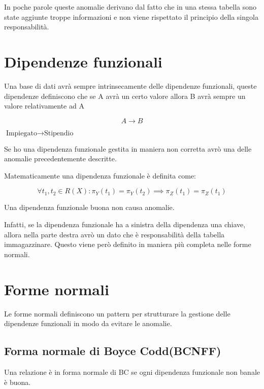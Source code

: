 In poche parole queste anomalie derivano dal fatto che in una stessa tabella sono state aggiunte troppe informazioni e non viene rispettato il principio della singola responsabilità.

\section{Dipendenze funzionali}

Una base di dati avrà sempre intrinsecamente delle dipendenze funzionali, queste dipendenze definiscono che se A avrà un certo valore allora B avrà sempre un valore relativamente ad A

\[ A \rightarrow B\]

\begin{exmp}
    $\text{Impiegato} \rightarrow \text{Stipendio}$
\end{exmp} 

Se ho una dipendenza funzionale gestita in maniera non corretta avrò una delle anomalie precedentemente descritte.

Matematicamente una dipendenza funzionale è definita come:

\[\forall t_1,t_2 \in R(X) : \pi_Y(t_1) = \pi_Y(t_2) \implies \pi_Z(t_1) = \pi_Z(t_1) \]


Una dipendenza funzionale buona non causa anomalie.

Infatti, se la dipendenza funzionale ha a sinistra della dipendenza una chiave, allora nella parte destra avrò un dato che è responsabilità della tabella immagazzinare. Questo viene però definito in maniera più completa nelle forme normali.

\section{Forme normali}

Le forme normali definiscono un pattern per strutturare la gestione delle dipendenze funzionali in modo da evitare le anomalie.

\subsection{Forma normale di Boyce Codd(BCNFF)}

Una relazione è in forma normale di BC se ogni dipendenza funzionale non banale è buona.

